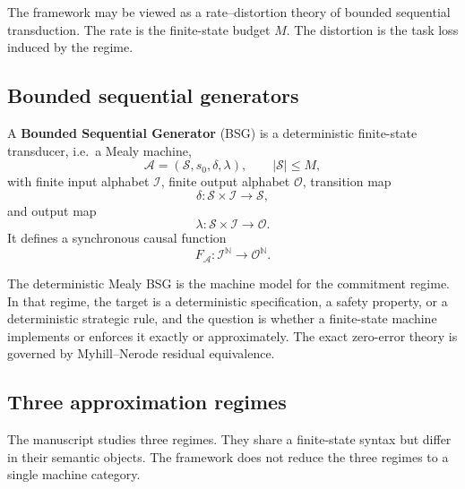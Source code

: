 \documentclass[12pt]{article}
\theoremstyle{definition}
\begin{document}
The framework may be viewed as a rate--distortion theory of bounded sequential
transduction.  The rate is the finite-state budget $M$.  The distortion is the
task loss induced by the regime.

\subsection{Bounded sequential generators}
\label{subsec:bsg-intro}

A \textbf{Bounded Sequential Generator} (BSG) is a deterministic finite-state
transducer, i.e.\ a Mealy machine,
\[
\mathcal A=(\mathcal S,s_0,\delta,\lambda),
\qquad
|\mathcal S|\le M,
\]
with finite input alphabet $\mathcal I$, finite output alphabet $\mathcal O$,
transition map
\[
\delta:\mathcal S\times\mathcal I\to\mathcal S,
\]
and output map
\[
\lambda:\mathcal S\times\mathcal I\to\mathcal O.
\]
It defines a synchronous causal function
\[
F_{\mathcal A}:\mathcal I^{\mathbb N}\to\mathcal O^{\mathbb N}.
\]

The deterministic Mealy BSG is the machine model for the commitment regime.
In that regime, the target is a deterministic specification, a safety
property, or a deterministic strategic rule, and the question is whether a
finite-state machine implements or enforces it exactly or approximately.  The
exact zero-error theory is governed by Myhill--Nerode residual equivalence.

\subsection{Three approximation regimes}
\label{subsec:three-regimes}

The manuscript studies three regimes.  They share a finite-state syntax but
differ in their semantic objects.  The framework does not reduce the three
regimes to a single machine category.
\end{document}
